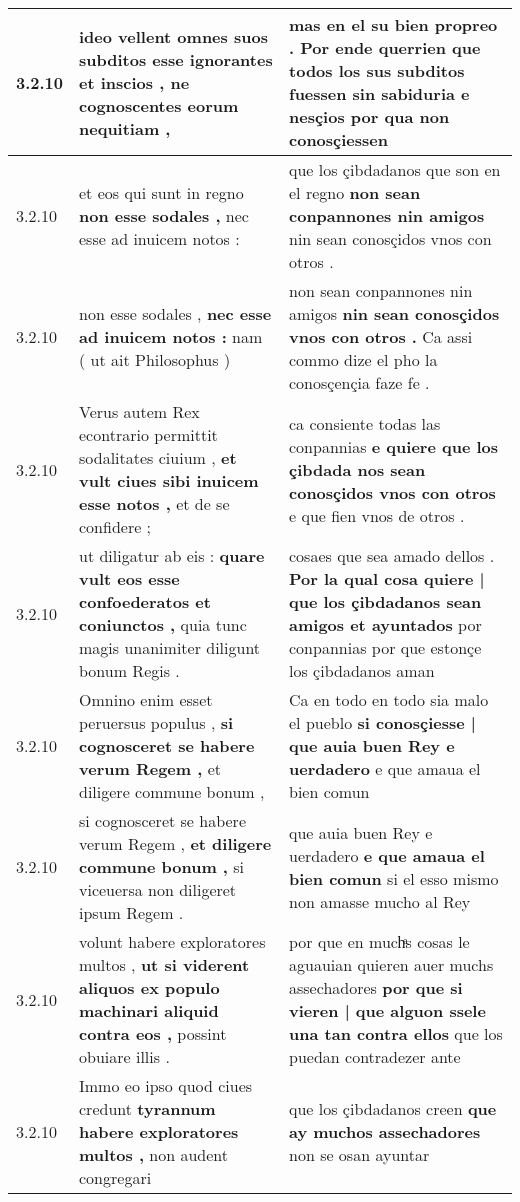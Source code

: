 \begin{tabular}{|p{1cm}|p{6.5cm}|p{6.5cm}|}
3.2.10 & ideo vellent omnes suos subditos \textbf{ esse ignorantes et inscios , } ne cognoscentes eorum nequitiam , & mas en el su bien propreo . \textbf{ Por ende querrien que todos los sus subditos fuessen sin sabiduria e nesçios } por qua non conosçiessen \\\hline
3.2.10 & et eos qui sunt in regno \textbf{ non esse sodales , } nec esse ad inuicem notos : & que los çibdadanos que son en el regno \textbf{ non sean conpannones nin amigos } nin sean conosçidos vnos con otros . \\\hline
3.2.10 & non esse sodales , \textbf{ nec esse ad inuicem notos : } nam ( ut ait Philosophus ) & non sean conpannones nin amigos \textbf{ nin sean conosçidos vnos con otros . } Ca assi commo dize el pho la conosçençia faze fe . \\\hline
3.2.10 & Verus autem Rex econtrario permittit sodalitates ciuium , \textbf{ et vult ciues sibi inuicem esse notos , } et de se confidere ; & ca consiente todas las conpannias \textbf{ e quiere que los çibdada nos sean conosçidos vnos con otros } e que fien vnos de otros . \\\hline
3.2.10 & ut diligatur ab eis : \textbf{ quare vult eos esse confoederatos et coniunctos , } quia tunc magis unanimiter diligunt bonum Regis . & cosaes que sea amado dellos . \textbf{ Por la qual cosa quiere | que los çibdadanos sean amigos et ayuntados } por conpannias por que estonçe los çibdadanos aman \\\hline
3.2.10 & Omnino enim esset peruersus populus , \textbf{ si cognosceret se habere verum Regem , } et diligere commune bonum , & Ca en todo en todo sia malo el pueblo \textbf{ si conosçiesse | que auia buen Rey e uerdadero } e que amaua el bien comun \\\hline
3.2.10 & si cognosceret se habere verum Regem , \textbf{ et diligere commune bonum , } si viceuersa non diligeret ipsum Regem . & que auia buen Rey e uerdadero \textbf{ e que amaua el bien comun } si el esso mismo non amasse mucho al Rey \\\hline
3.2.10 & volunt habere exploratores multos , \textbf{ ut si viderent aliquos ex populo machinari aliquid contra eos , } possint obuiare illis . & por que en muchͣs cosas le aguauian quieren auer muchs assechadores \textbf{ por que si vieren | que alguon ssele una tan contra ellos } que los puedan contradezer ante \\\hline
3.2.10 & Immo eo ipso quod ciues credunt \textbf{ tyrannum habere exploratores multos , } non audent congregari & que los çibdadanos creen \textbf{ que ay muchos assechadores } non se osan ayuntar \\\hline

\end{tabular}

